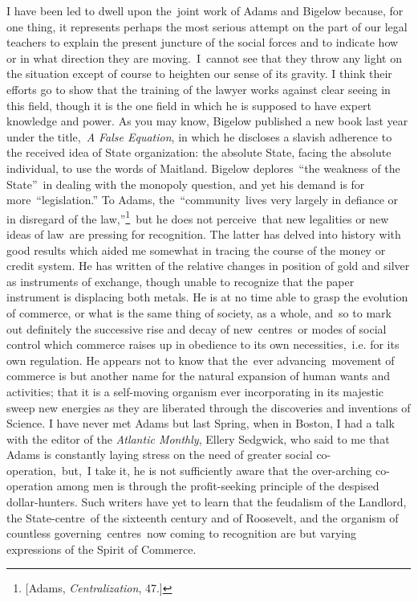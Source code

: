 \documentclass[openany,nobib]{tufte-book}
\begin{document}
I have been led to dwell upon the~joint work of Adams and Bigelow
because, for one thing, it represents perhaps the most serious attempt
on the part of our legal teachers to explain the present juncture of the
social forces and to indicate how or in what direction they are
moving.~I~cannot see that they throw any light on the situation except
of course to heighten our sense of its gravity. I think their efforts go
to show that the training of the lawyer works against clear seeing in
this field, though it is the one field in which he is supposed to have
expert knowledge and power. As you may know, Bigelow published a new
book last year under the title,~\emph{A False Equation}, in which he
discloses a slavish adherence to the received idea of State
organization: the absolute State, facing the absolute individual, to use
the words of Maitland. Bigelow deplores~``the weakness of the State''~in
dealing with the monopoly question, and yet his demand is for
more~``legislation.'' To Adams, the~``community~lives very largely in
defiance or in disregard of the law,''\footnote{{[}Adams,
  \emph{Centralization}, 47.{]}}~but he does not perceive~that new
legalities or new ideas of law~are pressing for recognition. The latter
has delved into history with good results which aided me somewhat in
tracing the course of the money or credit system. He has written of the
relative changes in position of gold and silver as instruments of
exchange, though unable to recognize that the paper instrument is
displacing both metals. He is at no time able to grasp the evolution of
commerce, or what is the same thing of society, as a whole, and~so to
mark out definitely the successive rise and decay of new~centres~or
modes of social control which commerce raises up in obedience to its own
necessities,~i.e. for its own regulation. He appears not to know that
the~ever advancing~movement of commerce is but another name for the
natural expansion of human wants and activities; that it is a
self-moving organism ever incorporating in its majestic sweep new
energies as they are liberated through the discoveries and inventions of
Science. I have never met Adams but last Spring, when in Boston, I had a
talk with the editor of the \emph{Atlantic Monthly}, Ellery Sedgwick,
who said to me that Adams is constantly laying stress on the need of
greater social co-operation,~but,~I take it, he is not sufficiently
aware that the over-arching co-operation among men is through the
profit-seeking principle of the despised dollar-hunters. Such writers
have yet to learn that the feudalism of the Landlord, the
State-centre~of the sixteenth century and of Roosevelt, and the organism
of countless governing~centres~now coming to recognition are but varying
expressions of the Spirit of Commerce.~~
\end{document}
